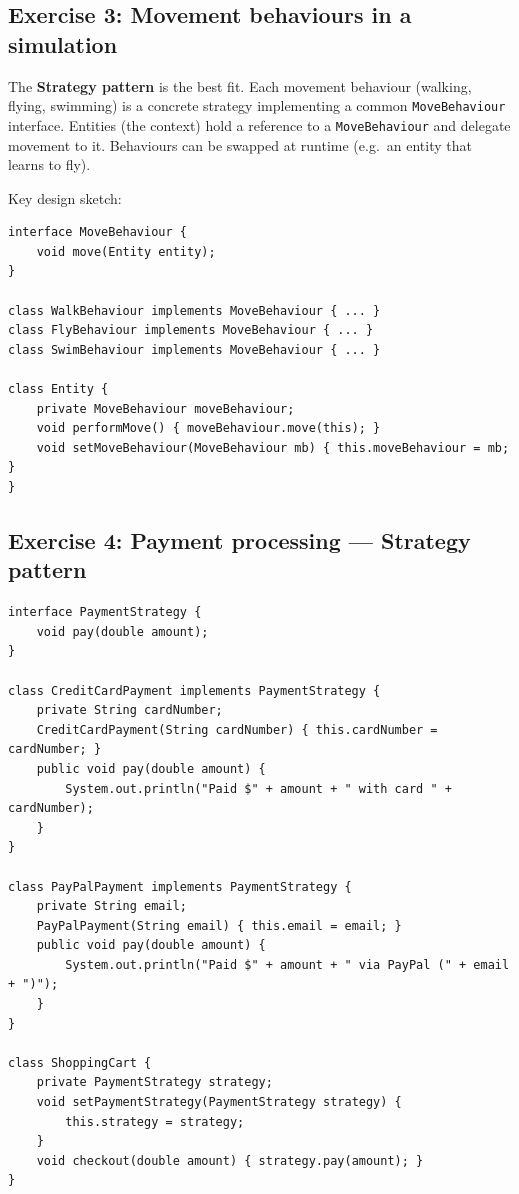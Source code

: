 \documentclass[twoside=false,DIV=14]{scrartcl}
\begin{document}
\subsection*{Exercise 3: Movement behaviours in a simulation}

The \textbf{Strategy pattern} is the best fit.  Each movement behaviour (walking, flying, swimming) is a concrete strategy implementing a common \texttt{MoveBehaviour} interface.  Entities (the context) hold a reference to a \texttt{MoveBehaviour} and delegate movement to it.  Behaviours can be swapped at runtime (e.g.\ an entity that learns to fly).

Key design sketch:
\begin{lstlisting}
interface MoveBehaviour {
    void move(Entity entity);
}

class WalkBehaviour implements MoveBehaviour { ... }
class FlyBehaviour implements MoveBehaviour { ... }
class SwimBehaviour implements MoveBehaviour { ... }

class Entity {
    private MoveBehaviour moveBehaviour;
    void performMove() { moveBehaviour.move(this); }
    void setMoveBehaviour(MoveBehaviour mb) { this.moveBehaviour = mb; }
}
\end{lstlisting}

\subsection*{Exercise 4: Payment processing --- Strategy pattern}

\begin{lstlisting}
interface PaymentStrategy {
    void pay(double amount);
}

class CreditCardPayment implements PaymentStrategy {
    private String cardNumber;
    CreditCardPayment(String cardNumber) { this.cardNumber = cardNumber; }
    public void pay(double amount) {
        System.out.println("Paid $" + amount + " with card " + cardNumber);
    }
}

class PayPalPayment implements PaymentStrategy {
    private String email;
    PayPalPayment(String email) { this.email = email; }
    public void pay(double amount) {
        System.out.println("Paid $" + amount + " via PayPal (" + email + ")");
    }
}

class ShoppingCart {
    private PaymentStrategy strategy;
    void setPaymentStrategy(PaymentStrategy strategy) {
        this.strategy = strategy;
    }
    void checkout(double amount) { strategy.pay(amount); }
}
\end{lstlisting}
\end{document}
